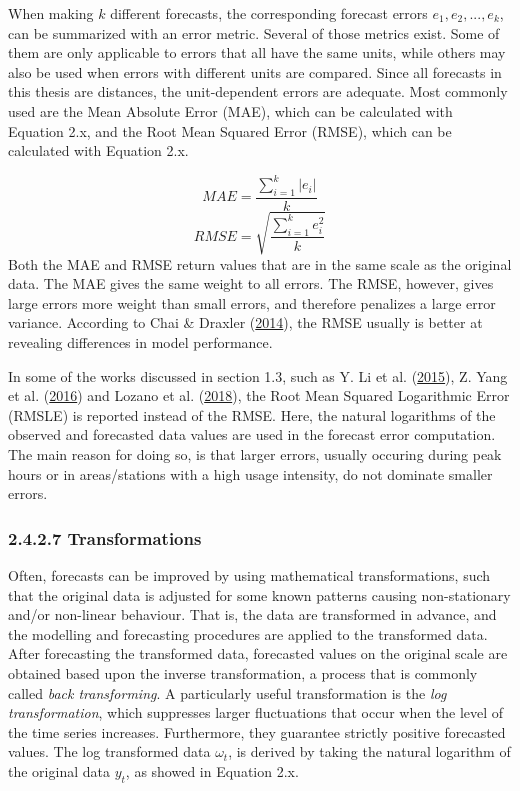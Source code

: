 \documentclass[12pt,oneside]{reedthesis}
\begin{document}
When making \(k\) different forecasts, the corresponding forecast errors
\(e_{1}, e_{2}, ..., e_{k}\), can be summarized with an error metric.
Several of those metrics exist. Some of them are only applicable to
errors that all have the same units, while others may also be used when
errors with different units are compared. Since all forecasts in this
thesis are distances, the unit-dependent errors are adequate. Most
commonly used are the Mean Absolute Error (MAE), which can be calculated
with Equation 2.x, and the Root Mean Squared Error (RMSE), which can be
calculated with Equation 2.x.

\[ MAE = \frac{\sum_{i = 1}^k |e_{i}|}{k} \]
\[ RMSE = \sqrt{\frac{\sum_{i = 1}^k e_{i}^{2}}{k}} \] Both the MAE and
RMSE return values that are in the same scale as the original data. The
MAE gives the same weight to all errors. The RMSE, however, gives large
errors more weight than small errors, and therefore penalizes a large
error variance. According to Chai \& Draxler
(\protect\hyperlink{ref-chai2014}{2014}), the RMSE usually is better at
revealing differences in model performance.

In some of the works discussed in section 1.3, such as Y. Li et al.
(\protect\hyperlink{ref-li2015}{2015}), Z. Yang et al.
(\protect\hyperlink{ref-yang2016}{2016}) and Lozano et al.
(\protect\hyperlink{ref-lozano2018}{2018}), the Root Mean Squared
Logarithmic Error (RMSLE) is reported instead of the RMSE. Here, the
natural logarithms of the observed and forecasted data values are used
in the forecast error computation. The main reason for doing so, is that
larger errors, usually occuring during peak hours or in areas/stations
with a high usage intensity, do not dominate smaller errors.

\subsubsection{2.4.2.7 Transformations}\label{transformations}

Often, forecasts can be improved by using mathematical transformations,
such that the original data is adjusted for some known patterns causing
non-stationary and/or non-linear behaviour. That is, the data are
transformed in advance, and the modelling and forecasting procedures are
applied to the transformed data. After forecasting the transformed data,
forecasted values on the original scale are obtained based upon the
inverse transformation, a process that is commonly called \emph{back
transforming}. A particularly useful transformation is the \emph{log
transformation}, which suppresses larger fluctuations that occur when
the level of the time series increases. Furthermore, they guarantee
strictly positive forecasted values. The log transformed data
\(\omega_{t}\), is derived by taking the natural logarithm of the
original data \(y_{t}\), as showed in Equation 2.x.
\end{document}
